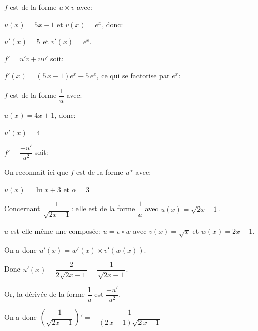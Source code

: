 \documentclass[a4paper,12pt]{scrartcl}
\begin{document}




$f$ est de la forme $u \times v$ avec:

$u(x) = 5x-1$ et $v(x) = e^{x}$, donc:

$u'(x) = 5$ et $v'(x) = e^{x}$.

$f' = u'v + uv'$ soit: 

$f'(x) = {\left(5 \, x - 1\right)} e^{x} + 5 \, e^{x}$, ce qui se factorise par $e^{x}$:



$f$ est de la forme $\dfrac{1}{u}$ avec:

$u(x) = 4x+1$, donc:

$u'(x) = 4$

$f' = \dfrac{-u'}{u^{2}}$ soit:






On reconnaît ici que $f$ est de la forme $u^{\alpha}$ avec:

$u(x) = \ln x + 3$ et $\alpha = 3$



Concernant $\dfrac{1}{\sqrt{2x-1}}$: elle est de la forme $\dfrac{1}{u}$ avec $u(x) = \sqrt{2x-1}$. 

$u$ est elle-même une composée: $u = v \circ w$ avec $v(x) = \sqrt{x}$ et $w(x) = 2x-1$.

On a donc $u'(x) = w'(x) \times v'(w(x))$. 

Donc $u'(x) = \dfrac{2}{2\sqrt{2x-1}} = \dfrac{1}{\sqrt{2x-1}}$.

Or, la dérivée de la forme $\dfrac{1}{u}$ est $\dfrac{-u'}{u^{2}}$.

On a donc $\left(\dfrac{1}{\sqrt{2x-1}}\right)' = - \dfrac{1}{\left(2 \, x - 1\right) \sqrt{2 \, x - 1}}$
\end{document}

